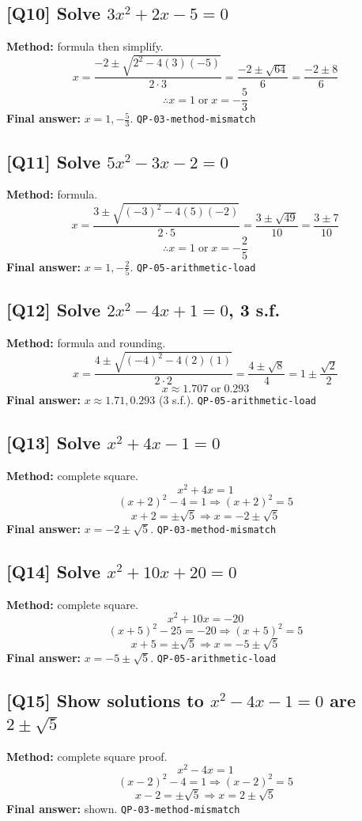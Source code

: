 \documentclass[11pt,a4paper]{article}
\newcommand{\QID}[1]{\textcolor{MPrimary}{\textbf{[#1]}}}
\newcommand{\Tag}[1]{\textcolor{MMuted}{\texttt{#1}}}
\begin{document}
\subsection*{\QID{Q10} Solve \(3x^2+2x-5=0\)}
\textbf{Method:} formula then simplify.
\[
x=\frac{-2\pm\sqrt{2^2-4(3)(-5)}}{2\cdot3}=\frac{-2\pm\sqrt{64}}{6}=\frac{-2\pm8}{6}
\]
\[
\therefore x=1\;\text{or}\;x=-\frac{5}{3}
\]
\textbf{Final answer:} \(x=1,-\frac{5}{3}\). \Tag{QP-03-method-mismatch}

\subsection*{\QID{Q11} Solve \(5x^2-3x-2=0\)}
\textbf{Method:} formula.
\[
x=\frac{3\pm\sqrt{(-3)^2-4(5)(-2)}}{2\cdot5}=\frac{3\pm\sqrt{49}}{10}=\frac{3\pm7}{10}
\]
\[
\therefore x=1\;\text{or}\;x=-\frac{2}{5}
\]
\textbf{Final answer:} \(x=1,-\frac25\). \Tag{QP-05-arithmetic-load}

\subsection*{\QID{Q12} Solve \(2x^2-4x+1=0\), 3 s.f.}
\textbf{Method:} formula and rounding.
\[
x=\frac{4\pm\sqrt{(-4)^2-4(2)(1)}}{2\cdot2}=\frac{4\pm\sqrt8}{4}=1\pm\frac{\sqrt2}{2}
\]
\[
x\approx1.707\;\text{or}\;0.293
\]
\textbf{Final answer:} \(x\approx1.71,0.293\) (3 s.f.). \Tag{QP-05-arithmetic-load}

\subsection*{\QID{Q13} Solve \(x^2+4x-1=0\)}
\textbf{Method:} complete square.
\[
x^2+4x=1
\]
\[
(x+2)^2-4=1 \Rightarrow (x+2)^2=5
\]
\[
x+2=\pm\sqrt5 \Rightarrow x=-2\pm\sqrt5
\]
\textbf{Final answer:} \(x=-2\pm\sqrt5\). \Tag{QP-03-method-mismatch}

\subsection*{\QID{Q14} Solve \(x^2+10x+20=0\)}
\textbf{Method:} complete square.
\[
x^2+10x=-20
\]
\[
(x+5)^2-25=-20 \Rightarrow (x+5)^2=5
\]
\[
x+5=\pm\sqrt5 \Rightarrow x=-5\pm\sqrt5
\]
\textbf{Final answer:} \(x=-5\pm\sqrt5\). \Tag{QP-05-arithmetic-load}

\subsection*{\QID{Q15} Show solutions to \(x^2-4x-1=0\) are \(2\pm\sqrt5\)}
\textbf{Method:} complete square proof.
\[
x^2-4x=1
\]
\[
(x-2)^2-4=1 \Rightarrow (x-2)^2=5
\]
\[
x-2=\pm\sqrt5 \Rightarrow x=2\pm\sqrt5
\]
\textbf{Final answer:} shown. \Tag{QP-03-method-mismatch}
\end{document}
